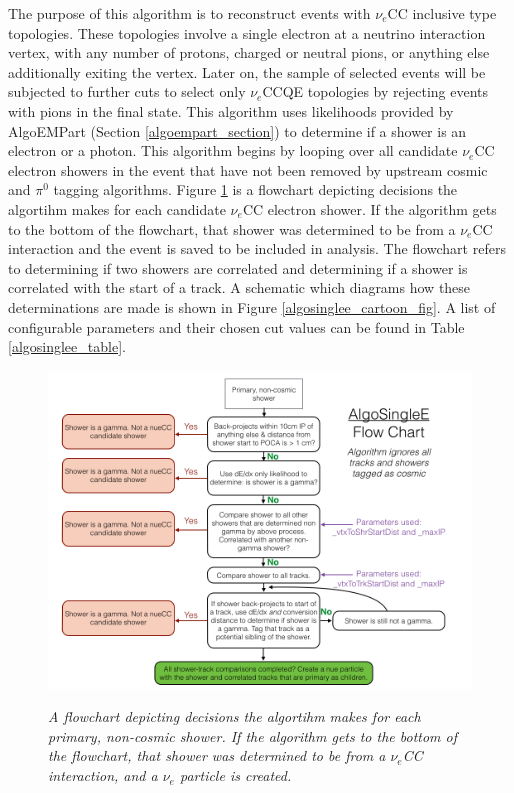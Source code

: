 The purpose of this algorithm is to reconstruct events with $\nu_e$CC inclusive type topologies. These topologies involve a single electron at a neutrino interaction vertex, with any number of protons, charged or neutral pions, or anything else additionally exiting the vertex. Later on, the sample of selected events will be subjected to further cuts to select only $\nu_e$CCQE topologies by rejecting events with pions in the final state. This algorithm uses likelihoods provided by AlgoEMPart (Section \ref{algoempart_section}) to determine if a shower is an electron or a photon. This algorithm begins by looping over all candidate $\nu_e$CC electron showers in the event that have not been removed by upstream cosmic and $\pi^0$ tagging algorithms. Figure \ref{algosinglee_flowchart_fig} is a flowchart depicting decisions the algortihm makes for each candidate $\nu_e$CC electron shower. If the algorithm gets to the bottom of the flowchart, that shower was determined to be from a $\nu_e$CC interaction and the event is saved to be included in analysis. The flowchart refers to determining if two showers are correlated and determining if a shower is correlated with the start of a track. A schematic which diagrams how these determinations are made is shown in Figure \ref{algosinglee_cartoon_fig}. A list of configurable parameters and their chosen cut values can be found in Table \ref{algosinglee_table}.\\


\begin{figure}[ht!]
\centering
\includegraphics[width=150mm]{Figures/algosinglee_flowchart.png}\\
\caption{\textit{A flowchart depicting decisions the algortihm makes for each primary, non-cosmic shower. If the algorithm gets to the bottom of the flowchart, that shower was determined to be from a $\nu_e$CC interaction, and a $\nu_e$ particle is created.}}
\label{algosinglee_flowchart_fig}
\end{figure}

